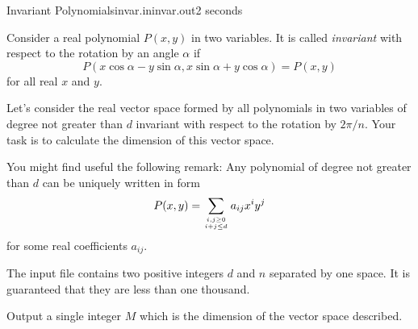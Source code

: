 \begin{problem}{Invariant Polynomials}{invar.in}{invar.out}{2 seconds}

Consider a real polynomial $P(x, y)$ in two variables. It is called 
{\em invariant\/} with respect to the rotation by an angle $\alpha$ if
$$P(x\cos\alpha-y\sin\alpha,x\sin\alpha+y\cos\alpha)=P(x, y)$$ for all
real $x$ and $y$.

Let's consider the real vector space formed by all polynomials in two
variables of degree not greater than $d$ invariant with respect to the
rotation by $2\pi/n$. Your task is to calculate the dimension of this
vector space.

You might find useful the following remark: 
Any polynomial of degree not greater than $d$ can be uniquely
written in form $$P(x, y)=\sum_{i,j\ge 0\atop i+j\le d} a_{ij} x^iy^j$$
for some real coefficients $a_{ij}$.

\InputFile

The input file contains two 
positive integers $d$ and $n$ separated by one space.
It is guaranteed that they are less than one thousand.

\OutputFile

Output a single integer $M$ which is the dimension of the vector space described.

\Example

\begin{example}
\end{example}

\end{problem}
